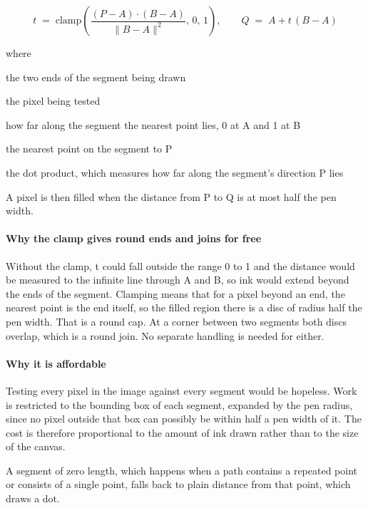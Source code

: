 \begin{equation}
t \;=\; \mathrm{clamp}\!\left(\frac{(P-A)\cdot(B-A)}{\lVert B-A \rVert^2},\, 0,\, 1\right), \qquad Q \;=\; A + t\,(B-A)
\end{equation}

\noindent where
\begin{description}[leftmargin=2.4em,style=nextline,font=\normalfont\ttfamily]\setlength\itemsep{1pt}
  \item[{$A,\, B$}] \normalfont the two ends of the segment being drawn
  \item[{$P$}] \normalfont the pixel being tested
  \item[{$t$}] \normalfont how far along the segment the nearest point lies, 0 at A and 1 at B
  \item[{$Q$}] \normalfont the nearest point on the segment to P
  \item[{$(P-A)\cdot(B-A)$}] \normalfont the dot product, which measures how far along the segment's direction P lies
\end{description}
A pixel is then filled when the distance from P to Q is at most half the pen width.


\paragraph{Why the clamp gives round ends and joins for free}
Without the clamp, t could fall outside the range 0 to 1 and the distance would be measured to the infinite line through A and B, so ink would extend beyond the ends of the segment. Clamping means that for a pixel beyond an end, the nearest point is the end itself, so the filled region there is a disc of radius half the pen width. That is a round cap. At a corner between two segments both discs overlap, which is a round join. No separate handling is needed for either.


\paragraph{Why it is affordable}
Testing every pixel in the image against every segment would be hopeless. Work is restricted to the bounding box of each segment, expanded by the pen radius, since no pixel outside that box can possibly be within half a pen width of it. The cost is therefore proportional to the amount of ink drawn rather than to the size of the canvas.

A segment of zero length, which happens when a path contains a repeated point or consists of a single point, falls back to plain distance from that point, which draws a dot.


